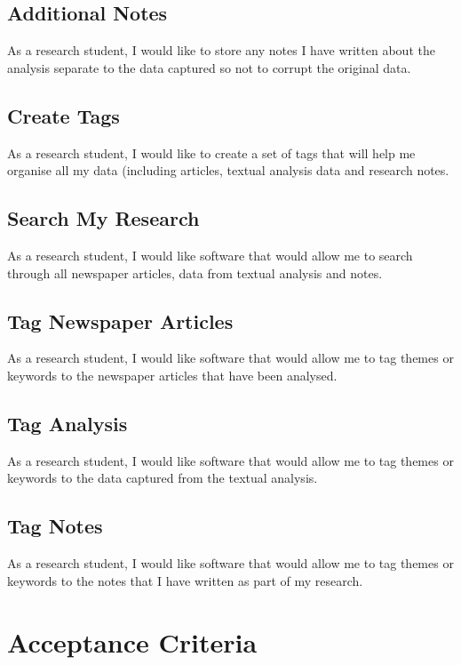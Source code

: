 \documentclass{article}
\begin{document}
\subsection*{Additional Notes}

As a research student, I would like to store any notes I have written about the analysis separate to the data captured so not to corrupt the original data.

\subsection*{Create Tags}

As a research student, I would like to create a set of tags that will help me organise all my data (including articles, textual analysis data and research notes.

\subsection*{Search My Research}

As a research student, I would like software that would allow me to search through all newspaper articles, data from textual analysis and notes.

\subsection*{Tag Newspaper Articles}

As a research student, I would like software that would allow me to tag themes or keywords to the newspaper articles that have been analysed.

\subsection*{Tag Analysis}

As a research student, I would like software that would allow me to tag themes or keywords to the data captured from the textual analysis.

\subsection*{Tag Notes}

As a research student, I would like software that would allow me to tag themes or keywords to the notes that I have written as part of my research.

\section*{Acceptance Criteria}
\end{document}
